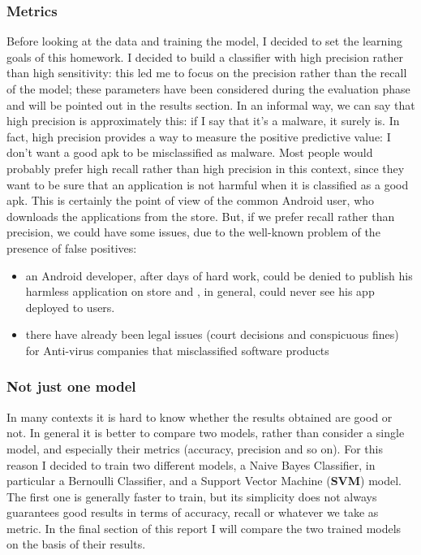 \documentclass[12pt]{article}
\begin{document}
\subsubsection{Metrics}
Before looking at the data and training the model, I decided to set the learning goals of this homework. I decided to build a classifier with high precision rather than high sensitivity: this led me to focus on the precision rather than the recall of the model; these parameters have been considered during the evaluation phase and will be pointed out in the results section.
In an informal way, we can say that high precision is approximately this: if I say that it's a malware, it surely is. In fact, high precision provides a way to measure the positive predictive value: I don't want a good apk to be misclassified as malware.
Most people would probably prefer high recall rather than high precision in this context, since they want to be sure that an application is not harmful when it is classified as a good apk. This is certainly the point of view of the common Android user, who downloads the applications from the store. But, if we prefer recall rather than precision, we could have some issues, due to the well-known problem of the presence of false positives:
\begin{itemize}
\item an Android developer, after days of hard work, could be denied to publish his harmless application on store and , in general, could never see his app deployed to users.
\item there have already been legal issues (court decisions and conspicuous fines) for Anti-virus companies that misclassified software products
\end{itemize}
\subsubsection{Not just one model}
In many contexts it is hard to know whether the results obtained are good or not. In general it is better to compare two models, rather than consider a single model, and especially their metrics (accuracy, precision and so on).
For this reason I decided to train two different models, a Naive Bayes Classifier, in particular a Bernoulli Classifier, and a Support Vector Machine (\textbf{SVM}) model. The first one is generally faster to train, but its simplicity does not always guarantees good results in terms of accuracy, recall or whatever we take as metric.
In the final section of this report I will compare the two trained models on the basis of their results. 
\end{document}
